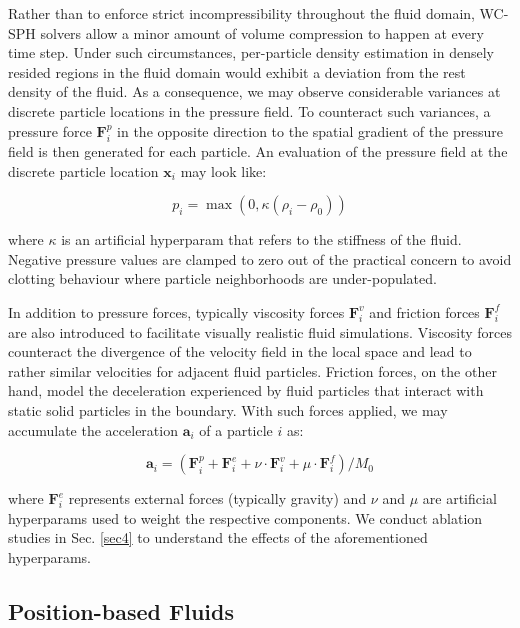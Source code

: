 \documentclass[
	11pt, 
	DIV10,
	ngerman,
	a4paper, 
	oneside, 
	headings=normal, 
	captions=tableheading,
	final, 
	numbers=noenddot
]{scrartcl}
\begin{document}
Rather than to enforce strict incompressibility throughout the fluid domain, WC-SPH solvers allow a minor amount of volume compression to happen at every time step. Under such circumstances, per-particle density estimation in densely resided regions in the fluid domain would exhibit a deviation from the rest density of the fluid. As a consequence, we may observe considerable variances at discrete particle locations in the pressure field. To counteract such variances, a pressure force $ \mathbf{F}_{i}^{p} $ in the opposite direction to the spatial gradient of the pressure field is then generated for each particle. An evaluation of the pressure field at the discrete particle location $ \boldsymbol{x}_{i} $ may look like:

\begin{equation}
	\label{eq14}
    p_{i} = \max(0, \kappa(\rho_{i} - \rho_{0}))
\end{equation}

where $ \kappa $ is an artificial hyperparam that refers to the stiffness of the fluid. Negative pressure values are clamped to zero out of the practical concern to avoid clotting behaviour where particle neighborhoods are under-populated. 

In addition to pressure forces, typically viscosity forces $ \mathbf{F}_{i}^{v} $ and friction forces $ \mathbf{F}_{i}^{f} $ are also introduced to facilitate visually realistic fluid simulations. Viscosity forces counteract the divergence of the velocity field in the local space and lead to rather similar velocities for adjacent fluid particles. Friction forces, on the other hand, model the deceleration experienced by fluid particles that interact with static solid particles in the boundary. With such forces applied, we may accumulate the acceleration $ \boldsymbol{a}_{i} $ of a particle $ i $ as:

\begin{equation}
	\label{eq15}
	\boldsymbol{a}_{i} = \left(\mathbf{F}_{i}^{p} + \mathbf{F}_{i}^{e} + \nu \cdot \mathbf{F}_{i}^{v} + \mu \cdot \mathbf{F}_{i}^{f} \right) / M_{0}
\end{equation}

where $ \mathbf{F}_{i}^{e} $ represents external forces (typically gravity) and $ \nu $ and $ \mu $ are artificial hyperparams used to weight the respective components. We conduct ablation studies in Sec. \ref{sec4} to understand the effects of the aforementioned hyperparams.

\subsection{Position-based Fluids}
\end{document}
